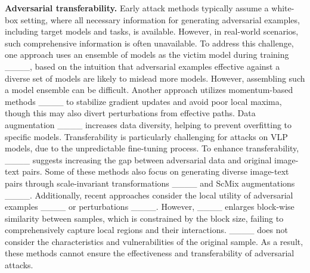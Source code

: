 
\noindent\textbf{Adversarial transferability.} Early attack methods typically assume a white-box setting, where all necessary information for generating adversarial examples, including target models and tasks, is available. However, in real-world scenarios, such comprehensive information is often unavailable. To address this challenge, one approach uses an ensemble of models as the victim model during training ____, based on the intuition that adversarial examples effective against a diverse set of models are likely to mislead more models. However, assembling such a model ensemble can be difficult. Another approach utilizes momentum-based methods ____ to stabilize gradient updates and avoid poor local maxima, though this may also divert perturbations from effective paths. Data augmentation ____ increases data diversity, helping to prevent overfitting to specific models. Transferability is particularly challenging for attacks on VLP models, due to the unpredictable fine-tuning process. To enhance transferability, ____ suggests increasing the gap between adversarial data and original image-text pairs. Some of these methods also focus on generating diverse image-text pairs through scale-invariant transformations ____ and ScMix augmentations ____. Additionally, recent approaches consider the local utility of adversarial examples ____ or perturbations ____. However, ____ enlarges block-wise similarity between samples, which is constrained by the block size, failing to comprehensively capture local regions and their interactions. ____ does not consider the characteristics and vulnerabilities of the original sample. As a result, these methods cannot ensure the effectiveness and transferability of adversarial attacks.